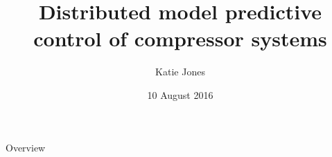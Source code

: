 \documentclass{beamer}
\author{Katie Jones}
\title{Distributed model predictive control of compressor systems}
\date{10 August 2016}
\institute[Control \& Optimization Group]{}
\begin{document}

\begin{frame}{Overview}
  \begin{multicols}{2}
	\tableofcontents
\end{multicols}
\end{frame}






\end{document}
